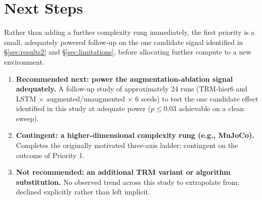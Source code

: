 \documentclass[11pt]{article}
\begin{document}
\section{Next Steps}
\label{sec:nextsteps}

Rather than adding a further complexity rung immediately, the first priority is a small, adequately powered follow-up on the one candidate signal identified in \S\ref{sec:results2} and \S\ref{sec:limitations}, before allocating further compute to a new environment.

\begin{enumerate}
  \item \textbf{Recommended next: power the augmentation-ablation signal adequately.} A follow-up study of approximately 24 runs (TRM-hier6 and LSTM $\times$ augmented/unaugmented $\times$ 6 seeds) to test the one candidate effect identified in this study at adequate power ($p \leq 0.03$ achievable on a clean sweep).
  \item \textbf{Contingent: a higher-dimensional complexity rung (e.g., MuJoCo).} Completes the originally motivated three-axis ladder; contingent on the outcome of Priority 1.
  \item \textbf{Not recommended: an additional TRM variant or algorithm substitution.} No observed trend across this study to extrapolate from; declined explicitly rather than left implicit.
\end{enumerate}
\end{document}
